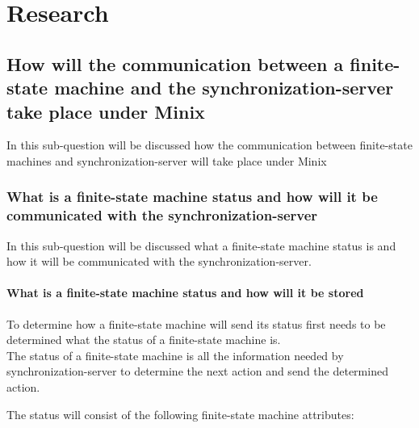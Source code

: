 \hypertarget{research}{%
\chapter{Research}\label{research}}

\hypertarget{how-will-the-communication-between-a-finite-state-machine-and-the-synchronization-server-take-place-under-minix}{%
\section{How will the communication between a finite-state machine and
the synchronization-server take place under
Minix}\label{how-will-the-communication-between-a-finite-state-machine-and-the-synchronization-server-take-place-under-minix}}

In this sub-question will be discussed how the communication between
finite-state machines and synchronization-server will take place under
Minix

\hypertarget{what-is-a-finite-state-machine-status-and-how-will-it-be-communicated-with-the-synchronization-server}{%
\subsection{What is a finite-state machine status and how will it be
communicated with the
synchronization-server}\label{what-is-a-finite-state-machine-status-and-how-will-it-be-communicated-with-the-synchronization-server}}

In this sub-question will be discussed what a finite-state machine
status is and how it will be communicated with the
synchronization-server.

\hypertarget{what-is-a-finite-state-machine-status-and-how-will-it-be-stored}{%
\subsubsection{What is a finite-state machine status and how will it be
stored}\label{what-is-a-finite-state-machine-status-and-how-will-it-be-stored}}

To determine how a finite-state machine will send its status first needs
to be determined what the status of a finite-state machine is.\\
The status of a finite-state machine is all the information needed by
synchronization-server to determine the next action and send the
determined action.

The status will consist of the following finite-state machine
attributes:

